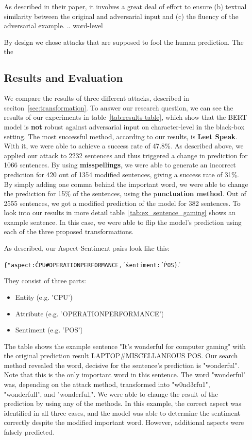 As described in their paper, it involves a great deal of effort to ensure (b) textual similarity between the original and adversarial input and (c) the fluency of the adversarial example.
.. word-level

By design we chose attacks that are supposed to fool the human prediction. The the

\subsection{Results and Evaluation}
We compare the results of three different attacks, described in seciton~\ref{sec:transformation}. To answer our research question, we can see the results of our experiments in table~\ref{tab:results-table}, which show that the BERT model is \textbf{not} robust against adversarial input on character-level in the black-box setting.
The most successful method, according to our results, is \textbf{Leet Speak}. With it, we were able to achieve a success rate of 47.8\%. As described above, we applied our attack to 2232 sentences and thus triggered a change in prediction for 1066 sentences. By using \textbf{misspellings}, we were able to generate an incorrect prediction for 420 out of 1354 modified sentences, giving a success rate of 31\%. By simply adding one comma behind the important word, we were able to change the prediction for 15\% of the sentences, using the p\textbf{unctuation method}.  Out of 2555 sentences, we got a modified prediction of the model for 382 sentences.
To look into our results in more detail table~\ref{tab:ex_sentence_gaming} shows an example sentence. In this case, we were able to flip the model's prediction using each of the three proposed transformations.

As described, our Aspect-Sentiment pairs look like this:

\texttt{\{"aspect\':\'CPU\#OPERATION\textunderscore PERFORMANCE\', \'sentiment\': \'POS\'\}}.

They consist of three parts:
\begin{itemize}
\item Entity (e.g. 'CPU')
\item Attribute (e.g. 'OPERATION\textunderscore PERFORMANCE')
\item Sentiment (e.g. 'POS')
\end{itemize}

The table shows the example sentence "It's wonderful for computer gaming" with the original prediction result LAPTOP\#MISCELLANEOUS POS. Our search method revealed the word, decisive for the sentence's prediction is "wonderful". Note that this is the only important word in this sentence. The word "wonderful" was, depending on the attack method, transformed into "w0nd3rfu1", "wonderfull", and "wonderful,". We were able to change the result of the prediction by using any of the methods. In this example, the correct aspect was identified in all three cases, and the model was able to determine the sentiment correctly despite the modified important word. However, additional aspects were falsely predicted. 

